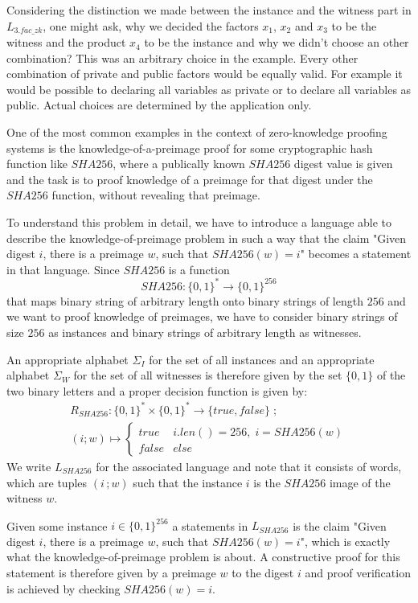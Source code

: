 \begin{example}[3-factorization]
Considering the distinction we made between the instance and the witness part in $L_{3.fac\_zk}$, one might ask, why we decided the factors $x_1$, $x_2$ and $x_3$ to be the witness and the product $x_4$ to be the instance and why we didn't choose an other combination? This was an arbitrary choice in the example. Every other combination of private and public factors would be equally valid. For example it would be possible to declaring all variables as private or to declare all variables as public. Actual choices are determined by the application only.
\end{example}
\begin{example} One of the most common examples in the context of zero-knowledge proofing systems is the knowledge-of-a-preimage proof for some cryptographic hash function like $SHA256$, where a publically known $SHA256$ digest value is given and the task is to proof knowledge of a preimage for that digest under the $SHA256$ function, without revealing that preimage. 

To understand this problem in detail, we have to introduce a language able to describe the knowledge-of-preimage problem in such a way that the claim "Given digest $i$, there is a preimage $w$, such that $SHA256(w)=i$" becomes a statement in that language. Since $SHA256$ is a function
$$
SHA256: \{0,1\}^* \to \{0,1\}^{256}
$$
that maps binary string of arbitrary length onto binary strings of length $256$ and we want to proof knowledge of preimages, we have to consider binary strings of size $256$ as instances and binary strings of arbitrary length as witnesses. 

An appropriate alphabet $\Sigma_I$ for the set of all instances and an appropriate alphabet $\Sigma_W$ for the set of all witnesses is therefore given by the set $\{0,1\}$ of the two binary letters and a proper decision function is given by:
\begin{multline*}
R_{SHA256} : \{0,1\}^* \times \{0,1\}^* \to \{true, false\}\;;\;\\
(i;w) \mapsto
\begin{cases}
true & i.len()=256,\; i = SHA256(w)\\
false & else
\end{cases}
\end{multline*}
We write $L_{SHA256}$ for the associated language and note that it consists of words, which are tuples $(i\,;w)$ such that the instance $i$ is the $SHA256$ image of the witness $w$. 

Given some instance $i\in \{0,1\}^{256}$ a statements in $L_{SHA256}$ is the claim "Given digest $i$, there is a preimage $w$, such that $SHA256(w)=i$", which is exactly what the knowledge-of-preimage problem is about. A constructive proof for this statement is therefore given by a preimage $w$ to the digest $i$ and proof verification is achieved by checking $SHA256(w)=i$. 
\end{example}
